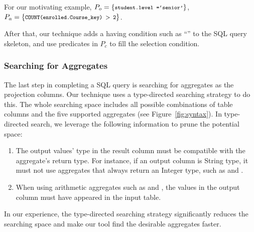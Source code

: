 For our motivating example,
$P_o = \{\CodeIn{student.level =`senior'}\}$, 
$P_a = \{\CodeIn{COUNT(enrolled.Course\_key) $>$ 2}\}$.

After that, our technique adds a having condition such as ``''
to the SQL query skeleton, and use predicates in $P_c$  to fill the selection condition.


\subsubsection{Searching for Aggregates}
\label{sec:agg_search}

The last step in completing a SQL query is searching for aggregates as the projection
columns. Our technique uses a type-directed searching strategy to do this. The whole
searching space includes all possible combinations of table columns and the five supported
aggregates (see Figure~\ref{fig:syntax}). In type-directed search, we leverage the following
information to prune the potential space:

\begin{enumerate}
\item The output values' type in the result column must be compatible with the aggregate's return
type. For instance, if an output column is String type, it must not use aggregates that always
return an Integer type, such as  and .

\item When using arithmetic aggregates such as  and , the values
in the output column must have appeared in the input table.
\end{enumerate}

In our experience, the type-directed searching strategy significantly reduces the
searching space and make our tool find the desirable aggregates faster.
